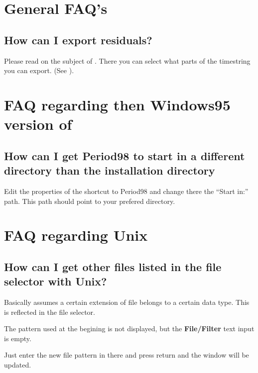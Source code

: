 \section{General FAQ's}

\subsection{How can I export residuals?}
Please read on the subject of 
. 
There you can select what parts of the timestring you can export.
(See ).

\section{FAQ regarding then Windows95 version of \periodname}

\subsection{How can I get Period98 to start in a different directory than the installation directory}

Edit the properties of the shortcut to Period98 and change there the
``Start in:'' path. This path should point to your prefered directory.


\section{FAQ regarding Unix}

\subsection{How can I get other files listed in the file selector with Unix?}
Basically \period assumes a certain extension of file belongs to a certain
data type. This is reflected in the file selector. 

The pattern used at the begining is not displayed, but the
{\bf File/Filter} text input is empty.

Just enter the new file pattern in there and press return and the
window will be updated.

